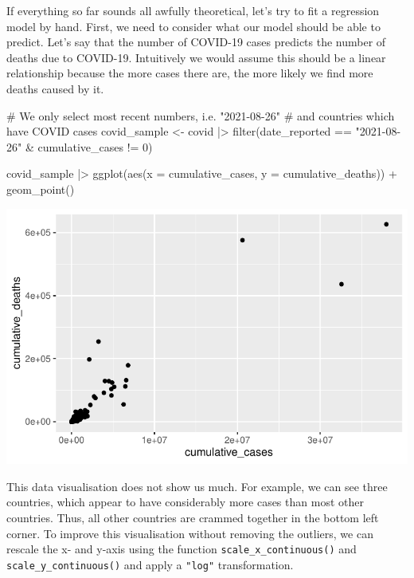 \documentclass[
  letterpaper,
]{krantz}
\makeatletter
\newenvironment{Shaded}{\begin{snugshade}}{\end{snugshade}}
\newcommand{\AttributeTok}[1]{\textcolor[rgb]{0.40,0.45,0.13}{#1}}
\newcommand{\CommentTok}[1]{\textcolor[rgb]{0.37,0.37,0.37}{#1}}
\newcommand{\DecValTok}[1]{\textcolor[rgb]{0.68,0.00,0.00}{#1}}
\newcommand{\FunctionTok}[1]{\textcolor[rgb]{0.28,0.35,0.67}{#1}}
\newcommand{\NormalTok}[1]{\textcolor[rgb]{0.00,0.23,0.31}{#1}}
\newcommand{\OtherTok}[1]{\textcolor[rgb]{0.00,0.23,0.31}{#1}}
\newcommand{\SpecialCharTok}[1]{\textcolor[rgb]{0.37,0.37,0.37}{#1}}
\newcommand{\StringTok}[1]{\textcolor[rgb]{0.13,0.47,0.30}{#1}}
\newenvironment{kframe}{%
\medskip{}
\setlength{\fboxsep}{.8em}
 \def\at@end@of@kframe{}%
 \ifinner\ifhmode%
  \def\at@end@of@kframe{\end{minipage}}%
  \begin{minipage}{\columnwidth}%
 \fi\fi%
 \def\FrameCommand##1{\hskip\@totalleftmargin \hskip-\fboxsep
 \colorbox{shadecolor}{##1}\hskip-\fboxsep
     \hskip-\linewidth \hskip-\@totalleftmargin \hskip\columnwidth}%
 \MakeFramed {\advance\hsize-\width
   \@totalleftmargin\z@ \linewidth\hsize
   \@setminipage}}%
 {\par\unskip\endMakeFramed%
 \at@end@of@kframe}
\renewenvironment{Shaded}{\begin{kframe}}{\end{kframe}}
\makeatother
\begin{document}
If everything so far sounds all awfully theoretical, let's try to fit a
regression model by hand. First, we need to consider what our model
should be able to predict. Let's say that the number of COVID-19 cases
predicts the number of deaths due to COVID-19. Intuitively we would
assume this should be a linear relationship because the more cases there
are, the more likely we find more deaths caused by it.

\begin{Shaded}
\begin{Highlighting}[]
\CommentTok{\# We only select most recent numbers, i.e. "2021{-}08{-}26"}
\CommentTok{\# and countries which have COVID cases}
\NormalTok{covid\_sample }\OtherTok{\textless{}{-}}
\NormalTok{  covid }\SpecialCharTok{|\textgreater{}}
  \FunctionTok{filter}\NormalTok{(date\_reported }\SpecialCharTok{==} \StringTok{"2021{-}08{-}26"} \SpecialCharTok{\&}
\NormalTok{         cumulative\_cases }\SpecialCharTok{!=} \DecValTok{0}\NormalTok{)}

\NormalTok{covid\_sample }\SpecialCharTok{|\textgreater{}}
  \FunctionTok{ggplot}\NormalTok{(}\FunctionTok{aes}\NormalTok{(}\AttributeTok{x =}\NormalTok{ cumulative\_cases,}
             \AttributeTok{y =}\NormalTok{ cumulative\_deaths)) }\SpecialCharTok{+}
  \FunctionTok{geom\_point}\NormalTok{()}
\end{Highlighting}
\end{Shaded}

\includegraphics{13_regressions_files/figure-latex/fitting-model-by-hand-step-one-1.pdf}

This data visualisation does not show us much. For example, we can see
three countries, which appear to have considerably more cases than most
other countries. Thus, all other countries are crammed together in the
bottom left corner. To improve this visualisation without removing the
outliers, we can rescale the x- and y-axis using the function
\texttt{scale\_x\_continuous()} and \texttt{scale\_y\_continuous()} and
apply a \texttt{"log"} transformation.
\end{document}
